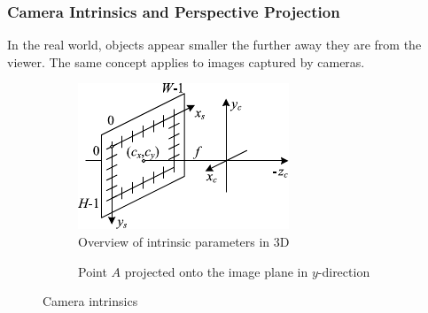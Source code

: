\cite{de_vries_learn_2020}


\subsubsection{Camera Intrinsics and Perspective Projection}
In the real world, objects appear smaller the further away they are from the viewer.
The same concept applies to images captured by cameras.

\begin{figure}[h!]
    \centering
\end{figure}

\begin{figure}[ht!]
    \centering
    \begin{subfigure}[t]{0.45\textwidth} %
        \includegraphics[width=1\linewidth]{images/intrinsics}
        \caption{Overview of intrinsic parameters in 3D}
    \end{subfigure}%
    \hspace{0.05\textwidth} %
    \begin{subfigure}[t]{0.45\textwidth} %
        \resizebox{\linewidth}{!}{
            
        }
    \caption{Point $A$ projected onto the image plane in $y$-direction}
    \end{subfigure}%
    \caption{Camera intrinsics}
    \label{fig:intrinsics}
\end{figure}


\cite{szeliski_computer_nodate}

